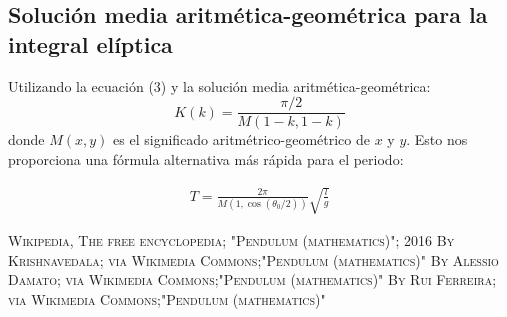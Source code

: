 \documentclass[12pt]{article}
\begin{document}
\subsection{Solución media aritmética-geométrica para la integral elíptica}

Utilizando la ecuación (3) y la solución media aritmética-geométrica:
$$
K(k)= \frac{\pi / 2}{M(1-k,1-k)}
$$
donde $M(x,y)$ es el significado aritmétrico-geométrico de $x$ y $y$. Esto nos proporciona una fórmula alternativa más rápida para el periodo:

\begin{eqnarray*}
T=\frac{2\pi}{M(1,\cos(\theta_0 /2))}\sqrt{\frac{l}{g}}
\end{eqnarray*}

\pagebreak
\begin{thebibliography}{X}
  \textsc{Wikipedia, The free encyclopedia; "Pendulum (mathematics)"; 2016}
  \textsc{By Krishnavedala; via Wikimedia Commons;"Pendulum (mathematics)"}
  \textsc{By Alessio Damato; via Wikimedia Commons;"Pendulum (mathematics)"}
  \textsc{By Rui Ferreira; via Wikimedia Commons;"Pendulum (mathematics)"}
\end{thebibliography}
\end{document}
